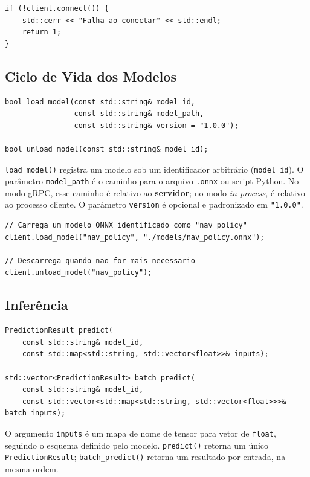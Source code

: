 \begin{lstlisting}[style=vscode]
if (!client.connect()) {
    std::cerr << "Falha ao conectar" << std::endl;
    return 1;
}
\end{lstlisting}

\subsection{Ciclo de Vida dos Modelos}

\begin{lstlisting}[style=vscode]
bool load_model(const std::string& model_id,
                const std::string& model_path,
                const std::string& version = "1.0.0");

bool unload_model(const std::string& model_id);
\end{lstlisting}

\texttt{load\_model()} registra um modelo sob um identificador arbitrário (\texttt{model\_id}). O parâmetro \texttt{model\_path} é o caminho para o arquivo \texttt{.onnx} ou script Python. No modo gRPC, esse caminho é relativo ao \textbf{servidor}; no modo \textit{in-process}, é relativo ao processo cliente. O parâmetro \texttt{version} é opcional e padronizado em \texttt{"1.0.0"}.

\begin{lstlisting}[style=vscode]
// Carrega um modelo ONNX identificado como "nav_policy"
client.load_model("nav_policy", "./models/nav_policy.onnx");

// Descarrega quando nao for mais necessario
client.unload_model("nav_policy");
\end{lstlisting}

\subsection{Inferência}

\begin{lstlisting}[style=vscode]
PredictionResult predict(
    const std::string& model_id,
    const std::map<std::string, std::vector<float>>& inputs);

std::vector<PredictionResult> batch_predict(
    const std::string& model_id,
    const std::vector<std::map<std::string, std::vector<float>>>& batch_inputs);
\end{lstlisting}

O argumento \texttt{inputs} é um mapa de nome de tensor para vetor de \texttt{float}, seguindo o esquema definido pelo modelo. \texttt{predict()} retorna um único \texttt{PredictionResult}; \texttt{batch\_predict()} retorna um resultado por entrada, na mesma ordem.

